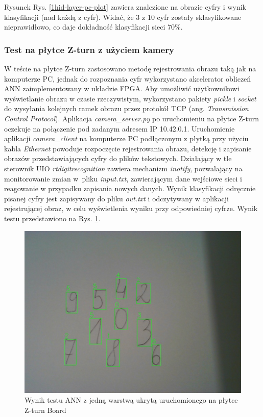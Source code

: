 Rysunek Rys. \ref{1hid-layer-pc-plot} zawiera znalezione na obrazie cyfry i wynik klasyfikacji (nad 
każdą z cyfr). Widać, że 3 z 10 cyfr zostały sklasyfikowane nieprawidłowo, co daje dokładność 
klasyfikacji sieci 70\%.

\subsubsection{Test na płytce Z-turn z użyciem kamery}

W teście na płytce Z-turn zastosowano metodę rejestrowania obrazu taką jak na komputerze PC, jednak 
do rozpoznania cyfr wykorzystano akcelerator obliczeń ANN zaimplementowany w układzie FPGA.  
Aby umożliwić użytkownikowi wyświetlanie obrazu w czasie rzeczywistym, wykorzystano pakiety \emph{pickle} i \emph{socket} do wysyłania kolejnych ramek obrazu przez protokół TCP (ang. \emph{Transmission Control Protocol}). Aplikacja \emph{camera\_server.py} po uruchomieniu na płytce Z-turn oczekuje na połączenie pod zadanym adresem IP 10.42.0.1. Uruchomienie aplikacji \emph{camera\_client} na komputerze PC podłączonym z płytką przy użyciu kabla \emph{Ethernet} powoduje rozpoczęcie rejestrowania obrazu, detekcję i zapisanie obrazów przedstawiających cyfry do plików tekstowych. Działający w tle sterownik UIO \emph{rtdigitrecognition} zawiera mechanizm \emph{inotify}, pozwalający na monitorowanie zmian w~pliku \emph{input.txt}, zawierającym dane wejściowe sieci i reagowanie w przypadku zapisania nowych danych. Wynik klasyfikacji odręcznie pisanej cyfry jest zapisywany do pliku \emph{out.txt} i odczytywany w aplikacji rejestrującej obraz, w celu wyświetlenia wyniku przy odpowiedniej cyfrze. Wynik testu przedstawiono na Rys. \ref{1hid-layer-zturn-img}.

\begin{figure}[!h]
    \centering
    \includegraphics[width=\textwidth]{img/1hid-layer-zturn-img.jpg}
    \caption{Wynik testu ANN z jedną warstwą ukrytą uruchomionego na płytce Z-turn Board}
    \label{1hid-layer-zturn-img}
\end{figure}

